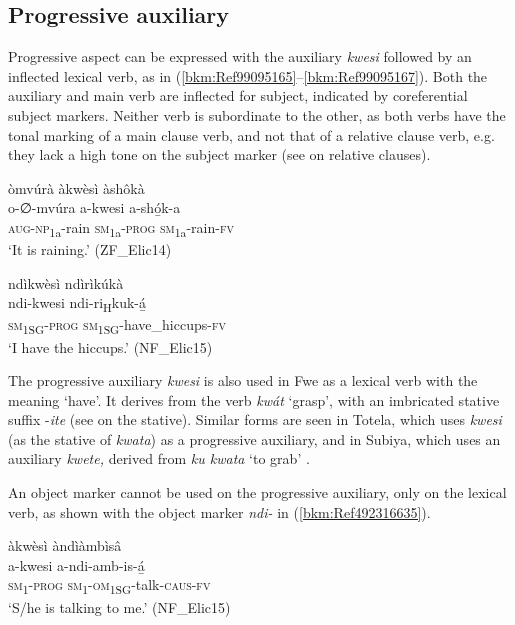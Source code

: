\subsection{Progressive auxiliary}
\label{bkm:Ref431917333}\label{bkm:Ref431917326}\hypertarget{Toc75352691}{}
Progressive aspect can be expressed with the auxiliary \textit{kwesi} followed by an inflected lexical verb, as in (\ref{bkm:Ref99095165}--\ref{bkm:Ref99095167}). Both the auxiliary and main verb are inflected for subject, indicated by coreferential subject markers. Neither verb is subordinate to the other, as both verbs have the tonal marking of a main clause verb, and not that of a relative clause verb, e.g. they lack a high tone on the subject marker (see  on relative clauses).

\ea
\label{bkm:Ref99095165}
òmvúrà àkwèsì àshôkà\\
\gll o-∅-mvúra    a-kwesi  a-shó̲k-a\\
\textsc{aug}-\textsc{np}\textsubscript{1a}-rain  \textsc{sm}\textsubscript{1a}-\textsc{prog}  \textsc{sm}\textsubscript{1a}-rain-\textsc{fv}\\
\glt ‘It is raining.’ (ZF\_Elic14)
\z

\ea
\label{bkm:Ref99095167}
ndìkwèsì ndìrìkúkà\\
\gll ndi-kwesi  ndi-ri\textsubscript{H}kuk-á̲\\
\textsc{sm}\textsubscript{1SG}-\textsc{prog}  \textsc{sm}\textsubscript{1SG}-have\_hiccups-\textsc{fv}\\
\glt ‘I have the hiccups.’ (NF\_Elic15)
\z

The progressive auxiliary \textit{kwesi} is also used in Fwe as a lexical verb with the meaning ‘have’. It derives from the verb \textit{kwát} ‘grasp’, with an imbricated stative suffix -\textit{ite} (see  on the stative). Similar forms are seen in Totela, which uses \textit{kwesi} (as the stative of \textit{kwata}) \citep[674]{Crane2019} as a progressive auxiliary, and in Subiya, which uses an auxiliary \textit{kwete,} derived from \textit{ku kwata} ‘to grab’ \citep[64]{Jacottet1896}.

An object marker cannot be used on the progressive auxiliary, only on the lexical verb, as shown with the object marker \textit{ndi-} in (\ref{bkm:Ref492316635}).

\ea
\label{bkm:Ref492316635}
àkwèsì àndìàmbìsâ\\
\gll a-kwesi  a-ndi-amb-is-á̲\\
\textsc{sm}\textsubscript{1}-\textsc{prog}  \textsc{sm}\textsubscript{1}-\textsc{om}\textsubscript{1SG}-talk-\textsc{caus}-\textsc{fv}\\
\glt ‘S/he is talking to me.’ (NF\_Elic15)
\z

